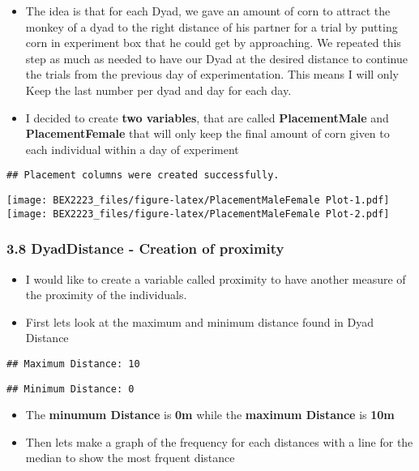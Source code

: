 \documentclass[
]{article}
\providecommand{\tightlist}{%
  \setlength{\itemsep}{0pt}\setlength{\parskip}{0pt}}
\begin{document}
\begin{itemize}
\tightlist
\item
  The idea is that for each Dyad, we gave an amount of corn to attract
  the monkey of a dyad to the right distance of his partner for a trial
  by putting corn in experiment box that he could get by approaching. We
  repeated this step as much as needed to have our Dyad at the desired
  distance to continue the trials from the previous day of
  experimentation. This means I will only Keep the last number per dyad
  and day for each day.
\item
  I decided to create \textbf{two variables}, that are called
  \textbf{PlacementMale} and \textbf{PlacementFemale} that will only
  keep the final amount of corn given to each individual within a day of
  experiment
\end{itemize}

\begin{verbatim}
## Placement columns were created successfully.
\end{verbatim}

\texttt{[image: BEX2223\_files/figure-latex/PlacementMaleFemale Plot-1.pdf]}
\texttt{[image: BEX2223\_files/figure-latex/PlacementMaleFemale Plot-2.pdf]}

\hypertarget{dyaddistance---creation-of-proximity}{%
\subsubsection{3.8 DyadDistance - Creation of
proximity}\label{dyaddistance---creation-of-proximity}}

\begin{itemize}
\tightlist
\item
  I would like to create a variable called proximity to have another
  measure of the proximity of the individuals.
\item
  First lets look at the maximum and minimum distance found in Dyad
  Distance
\end{itemize}

\begin{verbatim}
## Maximum Distance: 10
\end{verbatim}

\begin{verbatim}
## Minimum Distance: 0
\end{verbatim}

\begin{itemize}
\tightlist
\item
  The \textbf{minumum Distance} is \textbf{0m} while the \textbf{maximum
  Distance} is \textbf{10m}
\item
  Then lets make a graph of the frequency for each distances with a line
  for the median to show the most frquent distance
\end{itemize}
\end{document}
